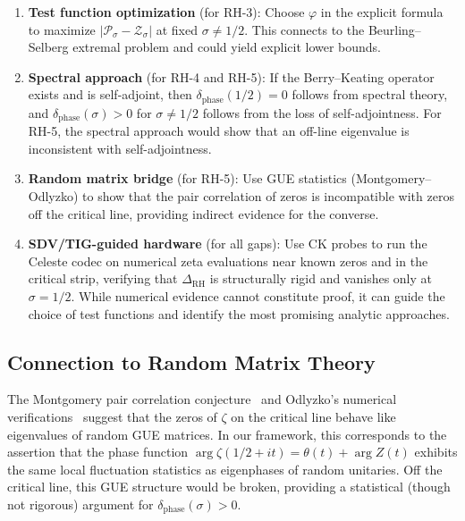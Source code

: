 \documentclass[11pt]{article}
\theoremstyle{remark}
\begin{document}
\begin{enumerate}
  \item \textbf{Test function optimization} (for RH-3):
    Choose $\varphi$ in the explicit formula to maximize
    $|\mathcal{P}_\sigma-\mathcal{Z}_\sigma|$ at fixed $\sigma\neq 1/2$.
    This connects to the Beurling--Selberg extremal problem and could yield
    explicit lower bounds.

  \item \textbf{Spectral approach} (for RH-4 and RH-5):
    If the Berry--Keating operator exists and is self-adjoint, then
    $\delta_{\mathrm{phase}}(1/2)=0$ follows from spectral theory, and
    $\delta_{\mathrm{phase}}(\sigma)>0$ for $\sigma\neq 1/2$ follows from the loss
    of self-adjointness.
    For RH-5, the spectral approach would show that an off-line eigenvalue is
    inconsistent with self-adjointness.

  \item \textbf{Random matrix bridge} (for RH-5):
    Use GUE statistics (Montgomery--Odlyzko) to show that the pair correlation of
    zeros is incompatible with zeros off the critical line, providing indirect
    evidence for the converse.

  \item \textbf{SDV/TIG-guided hardware} (for all gaps):
    Use CK probes to run the Celeste codec on numerical zeta evaluations near known
    zeros and in the critical strip, verifying that $\Delta_{\mathrm{RH}}$ is
    structurally rigid and vanishes only at $\sigma=1/2$.
    While numerical evidence cannot constitute proof, it can guide the choice of
    test functions and identify the most promising analytic approaches.
\end{enumerate}

\subsection{Connection to Random Matrix Theory}

The Montgomery pair correlation conjecture~\cite{Mont} and Odlyzko's numerical
verifications~\cite{Odl} suggest that the zeros of $\zeta$ on the critical line
behave like eigenvalues of random GUE matrices.
In our framework, this corresponds to the assertion that the phase function
$\arg\zeta(1/2+it)=\theta(t)+\arg Z(t)$ exhibits the same local fluctuation
statistics as eigenphases of random unitaries.
Off the critical line, this GUE structure would be broken, providing a statistical
(though not rigorous) argument for $\delta_{\mathrm{phase}}(\sigma)>0$.
\end{document}
